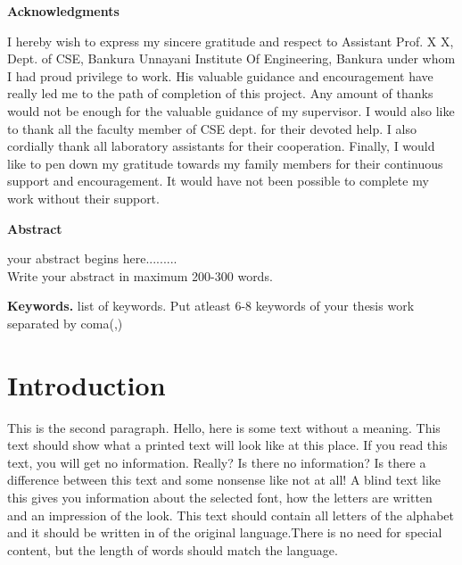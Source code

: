 \documentclass[12pt]{report}
\begin{document}
\begin{center}
        \vspace*{1cm}
         \LARGE
        \textbf{Acknowledgments}
        
        \vspace{1.5cm}
 \justify      
		I hereby wish to express my sincere gratitude and respect to Assistant Prof. X X, Dept. of CSE, Bankura Unnayani Institute Of Engineering, Bankura under whom I had proud privilege to work. His valuable guidance and encouragement have really led me to the path of completion of this project. Any amount of thanks would not be enough for the valuable guidance of my supervisor. 
I would also like to thank all the faculty member of CSE dept. for their devoted help. I also cordially thank all laboratory assistants for their cooperation.
Finally, I would like to pen down my gratitude towards my family members for their continuous support and encouragement. It would have not been possible to complete my work without their support.
   
        
     
        
       \vfill
        
       
        
        
        
    \end{center}
    


\newpage
\vspace*{1cm}
\begin{center}
\LARGE
\textbf{Abstract}
\end{center}

\justify
 your abstract begins here.........\\
 Write your abstract in maximum 200-300 words.
 
 \vspace*{1cm}
 \smallskip
\noindent \textbf{Keywords.} list of keywords.
 Put atleast 6-8 keywords of your thesis work separated by coma(,)
 

\newpage
\tableofcontents



\listoffigures


\newpage

\listoftables

\newpage
\chapter{Introduction}
This  is  the  second  paragraph. Hello, here is some text without 
a meaning.  This text should show what 
a printed text will look like at this place.  If you read this text, 
you will get no information.  Really?  Is there no information?  Is there 
a difference between this text and some nonsense like not at all!  A 
blind text like this gives you information about the selected font, how 
the letters are written and an impression of the look.  This text should
contain all letters of the alphabet and it should be written in of the
original language.There is no need for special content, but the length of
words should match the language.
\end{document}

